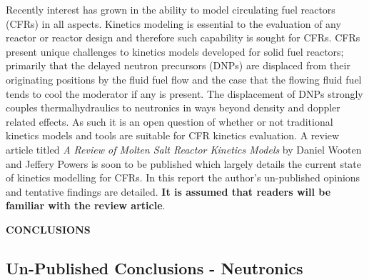 \documentclass[11pt,letterpaper,twoside,english,final]{article}
\begin{document}
{\renewcommand{\thefootnote}{\fnsymbol{footnote}}
Recently interest has grown in the ability to model circulating fuel reactors
(CFRs) in all aspects. Kinetics modeling is essential to the evaluation of any
reactor or reactor design and therefore such capability is sought for CFRs.
CFRs present unique challenges to kinetics models developed for solid fuel
reactors; primarily that the delayed neutron precursors (DNPs) are displaced
from their originating positions by the fluid fuel flow and the case that
the flowing fluid fuel tends to cool the moderator if any is present. The
displacement of DNPs strongly couples thermalhydraulics to neutronics in ways
beyond density and doppler related effects. As such it is an open question
of whether or not traditional kinetics models and tools are suitable for
CFR kinetics evaluation. A review article titled \textit{A Review of Molten Salt
Reactor Kinetics Models} by Daniel Wooten and Jeffery Powers is soon to be
published which largely details the current state of kinetics modelling for
CFRs. In this report the author's un-published opinions and tentative findings
are detailed. \textbf{It is assumed that readers will be familiar with the
review article}.

\begin{center}
{\bf{CONCLUSIONS}}
\end{center}

\begin{center}
\section{Un-Published Conclusions - Neutronics}
\end{center}

}
\end{document}
